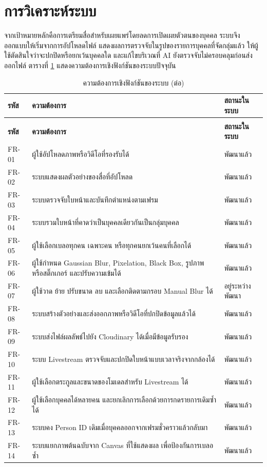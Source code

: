 \section{การวิเคราะห์ระบบ}

จากเป้าหมายหลักคือการเตรียมสื่อสำหรับเผยแพร่โดยลดการเปิดเผยตัวตนของบุคคล ระบบจึงออกแบบให้เริ่มจากการอัปโหลดไฟล์ แสดงผลการตรวจจับในรูปของรายการบุคคลที่จัดกลุ่มแล้ว ให้ผู้ใช้ตัดสินใจว่าจะปกปิดหรือยกเว้นบุคคลใด และแก้ไขบริเวณที่ AI ยังตรวจจับไม่ครอบคลุมก่อนส่งออกไฟล์ ตารางที่ \ref{tab:functional-requirements} แสดงความต้องการเชิงฟังก์ชันของระบบปัจจุบัน

\small
\setlength{\LTcapwidth}{\textwidth}
\begin{longtable}{|p{}|p{}|p{}|}
\caption{ความต้องการเชิงฟังก์ชันของระบบ}
\label{tab:functional-requirements}\\
\hline
\textbf{รหัส} & \textbf{ความต้องการ} & \textbf{สถานะในระบบ} \\
\hline
\endfirsthead
\caption[]{ความต้องการเชิงฟังก์ชันของระบบ (ต่อ)}\\
\hline
\textbf{รหัส} & \textbf{ความต้องการ} & \textbf{สถานะในระบบ} \\
\hline
\endhead
FR-01 & ผู้ใช้อัปโหลดภาพหรือวิดีโอที่รองรับได้ & พัฒนาแล้ว \\
\hline
FR-02 & ระบบแสดงผลตัวอย่างของสื่อที่อัปโหลด & พัฒนาแล้ว \\
\hline
FR-03 & ระบบตรวจจับใบหน้าและบันทึกตำแหน่งตามเฟรม & พัฒนาแล้ว \\
\hline
FR-04 & ระบบรวมใบหน้าที่คาดว่าเป็นบุคคลเดียวกันเป็นกลุ่มบุคคล & พัฒนาแล้ว \\
\hline
FR-05 & ผู้ใช้เลือกเบลอทุกคน เฉพาะคน หรือทุกคนยกเว้นคนที่เลือกได้ & พัฒนาแล้ว \\
\hline
FR-06 & ผู้ใช้กำหนด Gaussian Blur, Pixelation, Black Box, รูปภาพ หรือสติ๊กเกอร์  และปรับความเข้มได้ & พัฒนาแล้ว \\
\hline
FR-07 & ผู้ใช้วาด ย้าย ปรับขนาด ลบ และเลือกติดตามกรอบ Manual Blur ได้ & อยู่ระหว่างพัฒนา \\
\hline
FR-08 & ระบบสร้างตัวอย่างและส่งออกภาพหรือวิดีโอที่ปกปิดข้อมูลแล้วได้ & พัฒนาแล้ว \\
\hline
FR-09 & ระบบส่งไฟล์ผลลัพธ์ไปยัง Cloudinary ได้เมื่อมีข้อมูลรับรอง & พัฒนาแล้ว \\
\hline
FR-10 & ระบบ Livestream ตรวจจับและปกปิดใบหน้าแบบเวลาจริงจากกล้องได้ & พัฒนาแล้ว \\
\hline
FR-11 & ผู้ใช้เลือกตระกูลและขนาดของโมเดลสำหรับ Livestream ได้ & พัฒนาแล้ว \\
\hline
FR-12 & ผู้ใช้เลือกบุคคลได้หลายคน และยกเลิกการเลือกด้วยการกดรายการเดิมซ้ำได้ & พัฒนาแล้ว \\
\hline
FR-13 & ระบบคง Person ID เดิมเมื่อบุคคลออกจากเฟรมชั่วคราวแล้วกลับมา & พัฒนาแล้ว \\
\hline
FR-14 & ระบบแยกภาพต้นฉบับจาก Canvas ที่ใช้แสดงผล เพื่อป้องกันการเบลอซ้ำ & พัฒนาแล้ว \\
\hline
\end{longtable}

